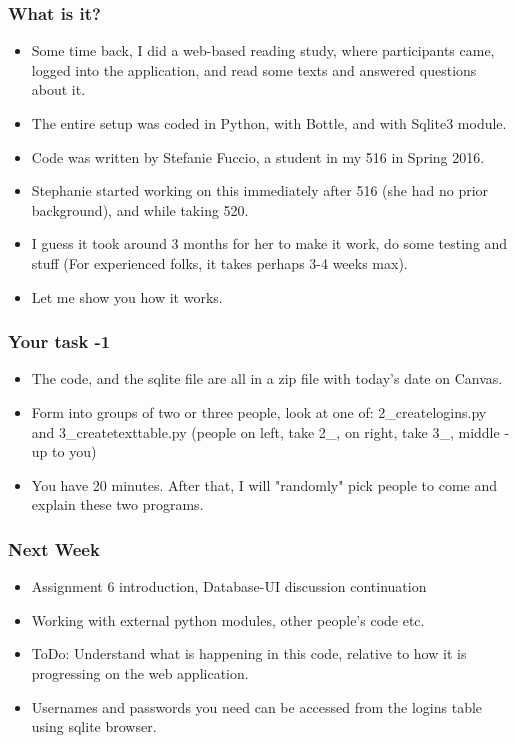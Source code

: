 \documentclass{beamer}
\begin{document}
\begin{frame}
\frametitle{What is it?}
\begin{itemize}
\item Some time back, I did a web-based reading study, where participants came, logged into the application, and read some texts and answered questions about it.
\item The entire setup was coded in Python, with Bottle, and with Sqlite3 module.
\item Code was written by Stefanie Fuccio, a student in my 516 in Spring 2016. \pause
\item Stephanie started working on this immediately after 516 (she had no prior background), and while taking 520.
\item I guess it took around 3 months for her to make it work, do some testing and stuff (For experienced folks, it takes perhaps 3-4 weeks max). 
\item Let me show you how it works.
\end{itemize}
\end{frame}

\begin{frame}
\frametitle{Your task -1}
\begin{itemize}
\item The code, and the sqlite file are all in a zip file with today's date on Canvas.
\item Form into groups of two or three people, look at one of: 2\_createlogins.py and 3\_createtexttable.py (people on left, take 2\_, on right, take 3\_, middle - up to you)
\item You have 20 minutes. After that, I will "randomly" pick people to come and explain these two programs. 
\end{itemize}
\end{frame}

\begin{frame}
\frametitle{Next Week}
\begin{itemize}
\item Assignment 6 introduction, Database-UI discussion continuation
\item Working with external python modules, other people's code etc. 
\item ToDo: Understand what is happening in this code, relative to how it is progressing on the web application. 
\item Usernames and passwords you need can be accessed from the logins table using sqlite browser.
\end{itemize}
\end{frame}
\end{document}

